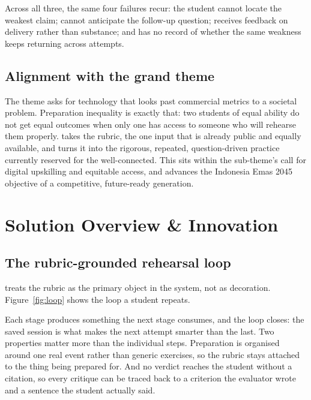 Across all three, the same four failures recur: the student cannot locate the
weakest claim; cannot anticipate the follow-up question; receives feedback on
delivery rather than substance; and has no record of whether the same weakness
keeps returning across attempts.

\subsection{Alignment with the grand theme}

The theme asks for technology that looks past commercial metrics to a societal
problem. Preparation inequality is exactly that: two students of equal ability
do not get equal outcomes when only one has access to someone who will rehearse
them properly. \ProductName{} takes the rubric, the one input that is already
public and equally available, and turns it into the rigorous, repeated,
question-driven practice currently reserved for the well-connected. This sits
within the \textbf{\SubTheme{}} sub-theme's call for digital upskilling and
equitable access, and advances the Indonesia Emas 2045 objective of a
competitive, future-ready generation.

\section{Solution Overview \& Innovation}

\subsection{The rubric-grounded rehearsal loop}

\ProductName{} treats the rubric as the primary object in the system, not as
decoration. Figure~\ref{fig:loop} shows the loop a student repeats.



Each stage produces something the next stage consumes, and the loop closes: the
saved session is what makes the next attempt smarter than the last. Two
properties matter more than the individual steps. Preparation is organised
around one real event rather than generic exercises, so the rubric stays
attached to the thing being prepared for. And no verdict reaches the student
without a citation, so every critique can be traced back to a criterion the
evaluator wrote and a sentence the student actually said.

